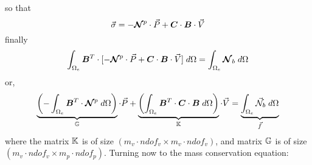 so that
\begin{equation}
\vec{\sigma} 
= - {\bm {{\mathcal{N}}}}^p
 \cdot {\vec P}  + 
{\bm C} \cdot  {\bm B}\cdot {\vec V}
\end{equation}
finally
\begin{equation}
\int_{\Omega_e} {\bm B}^T \cdot 
[
- {\bm {{\mathcal{N}}}}^p  \cdot {\vec P}  + {\bm C} \cdot  {\bm B}\cdot {\vec V}
]
\; d\Omega
=
\int_{\Omega_e} {\bm {{\mathcal{N}}}}_b \; d\Omega 
\end{equation}
or,
\begin{equation}
\underbrace{\left(-\int_{\Omega_e} {\bm B}^T \cdot 
{\bm {{\mathcal{N}}}}^p  
\; d\Omega \right)}_{{\mathbb{G}}} \cdot {\vec P} 
+
\underbrace{
\left(
\int_{\Omega_e} {\bm B}^T \cdot 
{\bm C} \cdot  {\bm B}
\; d\Omega
\right)}_{{\mathbb{K}}}
\cdot {\vec V}
=
\underbrace{\int_{\Omega_e} {\vec {{\mathcal{N}}}}_b \; d\Omega }_{\vec f}
\end{equation}
where the matrix ${\mathbb{K}}$ is of size $(m_v \cdot ndof_v \times m_v \cdot ndof_v)$, 
and matrix ${{\mathbb{G}}}$ is of size $(m_v \cdot ndof_v \times m_p \cdot ndof_p)$.
Turning now to the mass conservation equation:
